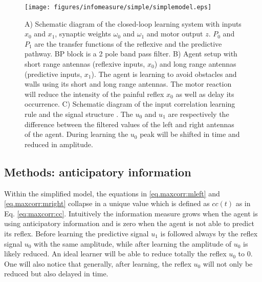 \begin{figure}[!htbp]
\begin{center}
\texttt{[image: figures/infomeasure/simple/simplemodel.eps]}
\end{center}
\caption[Simplified control model]{A) Schematic diagram of the closed-loop learning
 system with inputs $x_0$ and $x_1$, synaptic weights $\omega_0$ and $\omega_1$ and
 motor output $z$. $P_0$ and $P_1$ are the transfer functions of the reflexive and
 the predictive pathway. BP block is a 2 pole band pass filter. B) Agent setup with
 short range antennas (reflexive inputs, $x_0$) and long range antennas (predictive inputs, $x_1$).
The agent is learning to avoid obstacles and walls using its short and long range antennas.
The motor reaction will reduce the intensity of the painful reflex $x_0$ as well as
 delay its occurrence. C) Schematic diagram of the input correlation learning rule
 and the signal structure \citep{Porr2006ICO}. The $u_0$ and $u_1$ are respectively
 the difference between the filtered values of the left and right antennas of
the agent. During learning the $u_0$ peak will be shifted in time and reduced
 in amplitude. \label{maxcorr:methods:ico1}} 
\end{figure}

\subsection{Methods: anticipatory information}
Within the simplified model, the equations in \ref{eq.maxcorr:mleft} and \ref{eq.maxcorr:mright}
collapse in a unique value which is defined as $cc(t)$ as in Eq. \ref{eq:maxcorr:cc}.
Intuitively the information measure grows when the agent is using anticipatory information
and is zero when the agent is not able to predict its reflex.
Before learning the predictive signal $u_1$ is followed always by the reflex signal $u_0$
with the same amplitude, while after learning the amplitude of $u_0$ is likely reduced.
An ideal learner will be able to reduce totally the reflex $u_0$ to 0.
One will also notice that generally, after learning, the reflex $u_0$ will not only
be reduced but also delayed in time.

